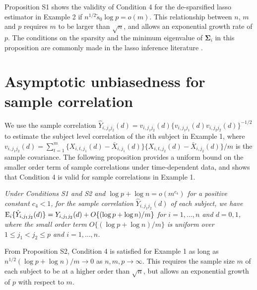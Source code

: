 \documentclass[12pt]{article}
\numberwithin{equation}{section}
\newtheorem{proposition}{Proposition}
\newcommand{\E}{\rm E}
\newcommand{\bSigma}{\boldsymbol{\Sigma}}
\begin{document}
\medskip

Proposition S1 shows the validity of Condition 4 for the de-sparsified lasso estimator in Example 2 if $n^{1/2} \tilde{s}_0 \log p = o(m)$. 
This relationship between $n$, $m$ and $p$ requires $m$ to be larger than $\sqrt{n}$, and allows an exponential growth rate of $p$.
The conditions on the sparsity and the minimum eigenvalue of $\bSigma_i$ in this proposition are commonly made in the lasso inference literature \citep{vanderGeerRitov2014, Ning17}.


\section{Asymptotic unbiasedness for sample correlation}

We use the sample correlation $\hat{Y}_{i, j_1j_2}(d) = v_{i, j_1j_2}(d) \{v_{i, j_1j_1}(d) v_{i, j_2j_2}(d)\}^{-1/2}$ 
to estimate the subject level correlation of the $i$th subject in Example 1, where $v_{i, j_1j_2}(d) = \sum_{t = 1}^{m} \{X_{i, t, j_1}(d) - \bar{X}_{i, j_1}(d)\}\{X_{i, t, j_2}(d) - \bar{X}_{i, j_2}(d)\} / m$ is the sample covariance.
The following proposition provides a uniform bound on the smaller order term of sample correlations under time-dependent data, and shows that Condition 4 is valid for sample correlations in Example 1.

\medskip

 {\it
Under Conditions S1 and S2 and $\log p + \log n = o(m^{c_4})$ for a positive constant $c_4 < 1$, for the sample correlation $\hat{Y}_{i, j_1j_2}(d)$ of each subject, we have ${\E}_{i}\{\hat{Y}_{i, j_1j_2}(d)\} = Y_{i, j_1j_2}(d) + O\{(\log p + \log n) / m\}$ for $i = 1, \ldots, n$ and $d = 0, 1$, where the small order term $O\{(\log p + \log n) / m\}$ is uniform over $1 \leq j_1 < j_2 \leq p$ and $i = 1, \ldots, n$.}

\medskip

From Proposition S2, Condition 4 is satisfied for Example 1 as long as $n^{1/2} (\log p + \log n) / m \to 0$ as $n, m, p \to \infty$. This requires the sample size $m$ of each subject to be at a higher order than $\sqrt{n}$, but allows an exponential growth of $p$ with respect to $m$.
\end{document}
